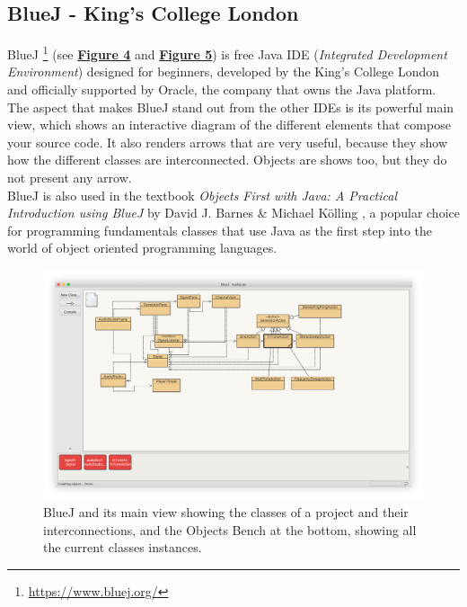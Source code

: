 \documentclass[]{usiinfbachelorproject}
\begin{document}
\subsection{BlueJ - King's College London}

BlueJ \footnote{\url{https://www.bluej.org/}} (see \hyperref[bluej_classes_objects]{\textbf{Figure 4}} and \hyperref[bluej_objects_open]{\textbf{Figure 5}}) is free Java IDE (\emph{Integrated Development Environment}) designed for beginners, developed by the King's College London and officially supported by Oracle, the company that owns the Java platform.
The aspect that makes BlueJ stand out from the other IDEs is its powerful main view, which shows an interactive diagram of the different elements that compose your source code. It also renders arrows that are very useful, because they show how the different classes are interconnected. Objects are shows too, but they do not present any arrow.\\
BlueJ is also used in the textbook \emph{Objects First with Java: A Practical Introduction using BlueJ} by David J. Barnes \& Michael K\"{o}lling \cite{barnes2016objects}, a popular choice for programming fundamentals classes that use Java as the first step into the world of object oriented programming languages.

\begin{figure}[h]
\centering
\includegraphics[width=\textwidth]{figures/bluej_classes_objects.png}
\caption {BlueJ and its main view showing the classes of a project and their interconnections, and the Objects Bench at the bottom, showing all the current classes instances.}
\label {bluej_classes_objects}
\end{figure}
\end{document}
